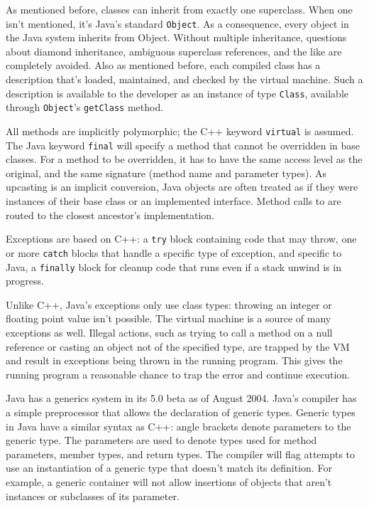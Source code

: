 As mentioned before, classes can inherit from exactly one superclass. When one
isn't mentioned, it's Java's standard \texttt{Object}. As a consequence, every
object in the Java system inherits from Object. Without multiple inheritance,
questions about diamond inheritance, ambiguous superclass references, and the
like are completely avoided. Also as mentioned before, each compiled class has
a description that's loaded, maintained, and checked by the virtual machine.
Such a description is available to the developer as an instance of type
\texttt{Class}, available through \texttt{Object}'s \texttt{getClass} method.

All methods are implicitly polymorphic; the C++ keyword \texttt{virtual} is
assumed. The Java keyword \texttt{final} will specify a method that cannot be
overridden in base classes. For a method to be overridden, it has to have the
same access level as the original, and the same signature (method name and
parameter types). As upcasting is an implicit conversion, Java objects are
often treated as if they were instances of their base class or an implemented
interface. Method calls to are routed to the closest ancestor's
implementation.

Exceptions are based on C++: a \texttt{try} block containing code that may
throw, one or more \texttt{catch} blocks that handle a specific type of
exception, and specific to Java, a \texttt{finally} block for cleanup code
that runs even if a stack unwind is in progress.

Unlike C++, Java's exceptions only use class types: throwing an integer or
floating point value isn't possible. The virtual machine is a source of many
exceptions as well. Illegal actions, such as trying to call a method on a null
reference or casting an object not of the specified type, are trapped by the
VM and result in exceptions being thrown in the running program. This gives
the running program a reasonable chance to trap the error and continue
execution.

Java has a generics system in its 5.0 beta as of August
2004\cite{java-generics}. Java's compiler has a simple preprocessor that
allows the declaration of generic types. Generic types in Java have a similar
syntax as C++: angle brackets denote parameters to the generic type. The
parameters are used to denote types used for method parameters, member types,
and return types. The compiler will flag attempts to use an instantiation of a
generic type that doesn't match its definition. For example, a generic
container will not allow insertions of objects that aren't instances or
subclasses of its parameter.


